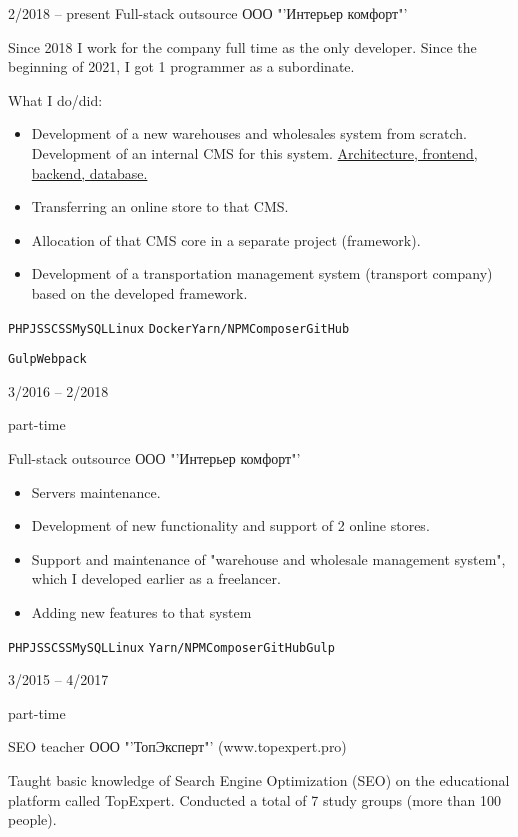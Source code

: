 \begin{entrylist}
	\entry
		{2/2018 -- present}
		{Full-stack outsource}
		{ООО "'Интерьер комфорт"' }
		{Since 2018 I work for the company full time as the only developer. Since the beginning of 2021, I got 1 programmer as a subordinate.

    What I do/did:
    \begin{itemize}
      \item Development of a new warehouses and wholesales system from scratch. Development of an internal CMS for this system. \underline{Architecture, frontend, backend, database.}
      \item Transferring an online store to that CMS.
      \item Allocation of that CMS core in a separate project (framework).
      \item Development of a transportation management system (transport company) based on the developed framework.
    \end{itemize}

		\texttt{PHP}\slashsep\texttt{JS}\slashsep\texttt{SCSS}\slashsep\texttt{MySQL}\slashsep\texttt{Linux}
    \slashsep\texttt{Docker}\slashsep\texttt{Yarn/NPM}\slashsep\texttt{Composer}\slashsep\texttt{GitHub}

    \texttt{Gulp}\slashsep\texttt{Webpack}}

	\entry
		{3/2016 -- 2/2018

		\footnotesize{part-time}}
		{Full-stack outsource}
		{ООО "'Интерьер комфорт"' }
		{
    \begin{itemize}
      \item Servers maintenance.
      \item Development of new functionality and support of 2 online stores.
      \item Support and maintenance of "warehouse and wholesale management system", which I developed earlier as a freelancer.
      \item Adding new features to that system
    \end{itemize}

		\texttt{PHP}\slashsep\texttt{JS}\slashsep\texttt{SCSS}\slashsep\texttt{MySQL}\slashsep\texttt{Linux}
    \slashsep\texttt{Yarn/NPM}\slashsep\texttt{Composer}\slashsep\texttt{GitHub}\slashsep\texttt{Gulp}
    }

	\entry
		{3/2015 -- 4/2017

		\footnotesize{part-time}}
		{SEO teacher}
		{ООО "'ТопЭксперт"' (www.topexpert.pro)}
		{Taught basic knowledge of Search Engine Optimization (SEO) on the educational platform called TopExpert. Conducted a total of 7 study groups (more than 100 people).

}
\end{entrylist}
